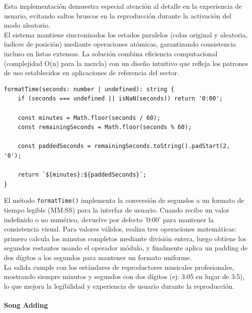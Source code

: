 \documentclass[11pt, a4paper]{article}
\begin{document}
                Esta implementación demuestra especial atención al detalle en la experiencia de usuario, evitando saltos bruscos en la reproducción durante la activación del modo aleatorio. \\

                El sistema mantiene sincronizados los estados paralelos (colas original y aleatoria, índices de posición) mediante operaciones atómicas, garantizando consistencia incluso en listas extensas. La solución combina eficiencia computacional (complejidad O(n) para la mezcla) con un diseño intuitivo que refleja los patrones de uso establecidos en aplicaciones de referencia del sector.

                \begin{lstlisting}[caption={formatTime()}]
formatTime(seconds: number | undefined): string {
    if (seconds === undefined || isNaN(seconds)) return '0:00';
    
    const minutes = Math.floor(seconds / 60);
    const remainingSeconds = Math.floor(seconds % 60);
    
    const paddedSeconds = remainingSeconds.toString().padStart(2, '0');
    
    return `${minutes}:${paddedSeconds}`;
}
                \end{lstlisting}

                El método \texttt{formatTime()} implementa la conversión de segundos a un formato de tiempo legible (MM:SS) para la interfaz de usuario. Cuando recibe un valor indefinido o no numérico, devuelve por defecto '0:00' para mantener la consistencia visual. Para valores válidos, realiza tres operaciones matemáticas: primero calcula los minutos completos mediante división entera, luego obtiene los segundos restantes usando el operador módulo, y finalmente aplica un padding de dos dígitos a los segundos para mantener un formato uniforme. \\

                La salida cumple con los estándares de reproductores musicales profesionales, mostrando siempre minutos y segundos con dos dígitos (ej: 3:05 en lugar de 3:5), lo que mejora la legibilidad y experiencia de usuario durante la reproducción. \\

                \paragraph{Song Adding}
                ‎
\end{document}
